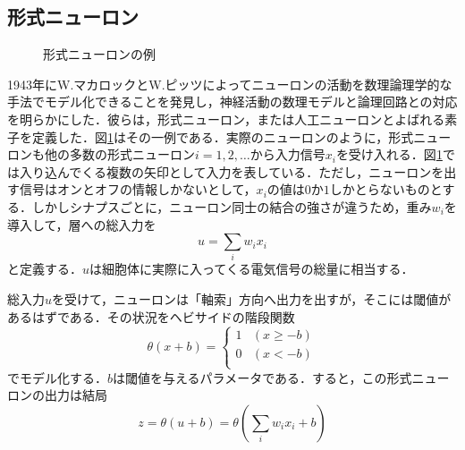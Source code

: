 \documentclass[a4paper,11pt]{jsreport}
\begin{document}
\subsection{形式ニューロン}
\begin{figure}[H]
  \centering
  \caption{形式ニューロンの例}
  \label{形式ニューロン}
\end{figure}
1943年にW.マカロックとW.ピッツによってニューロンの活動を数理論理学的な手法でモデル化できることを発見し，神経活動の数理モデルと論理回路との対応を明らかにした\cite{mcculloch43a}．彼らは，形式ニューロン，または人工ニューロンとよばれる素子を定義した．図\ref{形式ニューロン}はその一例である．実際のニューロンのように，形式ニューロンも他の多数の形式ニューロン$i=1,2,\dots$から入力信号$x_i$を受け入れる．図\ref{形式ニューロン}では入り込んでくる複数の矢印として入力を表している．ただし，ニューロンを出す信号はオンとオフの情報しかないとして，$x_i$の値は$0$か$1$しかとらないものとする．しかしシナプスごとに，ニューロン同士の結合の強さが違うため，重み$w_i$を導入して，層への総入力を
\begin{equation}
  u = \sum_{i} w_i x_i
\end{equation}
と定義する．$u$は細胞体に実際に入ってくる電気信号の総量に相当する．\par
総入力$u$を受けて，ニューロンは「軸索」方向へ出力を出すが，そこには閾値があるはずである．その状況をヘビサイドの階段関数
\begin{equation}
  \theta(x+b) = \begin{cases}
    1 & (x \geq -b) \\
    0 & (x < -b) \\
  \end{cases}
\end{equation}
でモデル化する．$b$は閾値を与えるパラメータである．すると，この形式ニューロンの出力は結局
\begin{equation}
  z = \theta(u + b) = \theta\left( \sum_{i} w_i x_i + b \right)
\end{equation}
\end{document}
